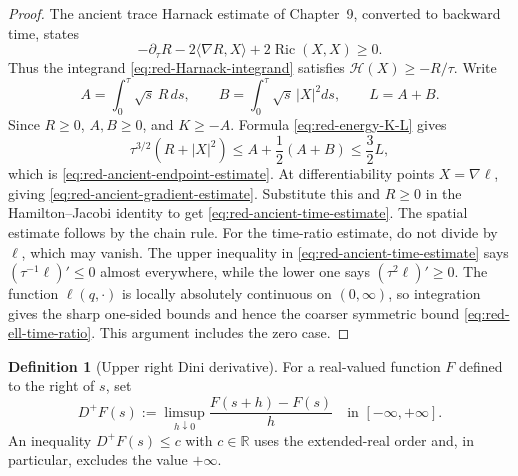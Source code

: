\documentclass[10pt]{coll-l}
\theoremstyle{definition}
\newtheorem{definition}[theorem]{Definition}
\theoremstyle{remark}
\numberwithin{section}{chapter}
\numberwithin{equation}{chapter}
\newcommand{\Ric}{\operatorname{Ric}}
\begin{document}
\begin{proof}
The ancient trace Harnack estimate of Chapter~9, converted to backward time,
states
\begin{equation}
 -\partial_\tau R-2\langle\nabla R,X\rangle
       +2\Ric(X,X)\geq0.                                \label{eq:red-ancient-Harnack-backward}
\end{equation}
Thus the integrand \eqref{eq:red-Harnack-integrand} satisfies
$\mathcal H(X)\geq-R/\tau$.  Write
\begin{equation}
 A=\int_0^\tau\sqrt s\,R\,ds,
 \qquad B=\int_0^\tau\sqrt s\,|X|^2ds,
 \qquad L=A+B.                                          \label{eq:red-action-A-B}
\end{equation}
Since $R\geq0$, $A,B\geq0$, and $K\geq-A$.  Formula
\eqref{eq:red-energy-K-L} gives
\begin{equation}
 \tau^{3/2}(R+|X|^2)\leq A+\frac12(A+B)\leq\frac32L,  \label{eq:red-energy-ancient-bound}
\end{equation}
which is \eqref{eq:red-ancient-endpoint-estimate}.  At differentiability
points $X=\nabla\ell$, giving
\eqref{eq:red-ancient-gradient-estimate}.  Substitute this and $R\geq0$ in
the Hamilton--Jacobi identity to get
\eqref{eq:red-ancient-time-estimate}.  The spatial estimate follows by the
chain rule.  For the time-ratio estimate, do not divide by $\ell$, which may
vanish.  The upper inequality in
\eqref{eq:red-ancient-time-estimate} says
$(\tau^{-1}\ell)'\leq0$ almost everywhere, while the lower one says
$(\tau^2\ell)'\geq0$.  The function $\ell(q,\cdot)$ is locally absolutely
continuous on $(0,\infty)$, so integration gives the sharp one-sided bounds
and hence the coarser symmetric bound \eqref{eq:red-ell-time-ratio}.  This
argument includes the zero case.
\end{proof}

\begin{definition}[Upper right Dini derivative]
\label{def:red-upper-Dini}
For a real-valued function $F$ defined to the right of $s$, set
\begin{equation}
 D^+F(s):=\limsup_{h\downarrow0}
              \frac{F(s+h)-F(s)}h
       \quad\text{in }[-\infty,+\infty].               \label{eq:red-upper-Dini-definition}
\end{equation}
An inequality $D^+F(s)\leq c$ with $c\in\mathbb R$ uses the extended-real
order and, in particular, excludes the value $+\infty$.
\end{definition}
\end{document}
